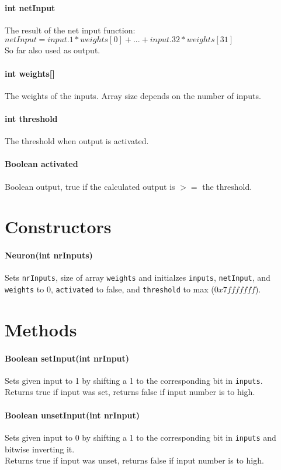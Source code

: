 \paragraph{int netInput}
The result of the net input function:\\
$netInput = input.1*weights[0] + ... + input.32*weights[31]$\\
So far also used as output.

\paragraph{int weights[]}
The weights of the inputs. Array size depends on the number of inputs.

\paragraph{int threshold}
The threshold when output is activated.

\paragraph{Boolean activated}
Boolean output, true if the calculated output is $>=$ the threshold.

\section{Constructors}
\paragraph{Neuron(int nrInputs)}
Sets \texttt{nrInputs}, size of array \texttt{weights} and initialzes \texttt{inputs}, \texttt{netInput}, and \texttt{weights} to 0, \texttt{activated} to false, and \texttt{threshold} to max ($0x7fffffff$).

\section{Methods}
\paragraph{Boolean setInput(int nrInput)}
Sets given input to 1 by shifting a 1 to the corresponding bit in \texttt{inputs}.\\
Returns true if input was set, returns false if input number is to high.

\paragraph{Boolean unsetInput(int nrInput)}
Sets given input to 0 by shifting a 1 to the corresponding bit in \texttt{inputs} and bitwise inverting it.\\
Returns true if input was unset, returns false if input number is to high.

